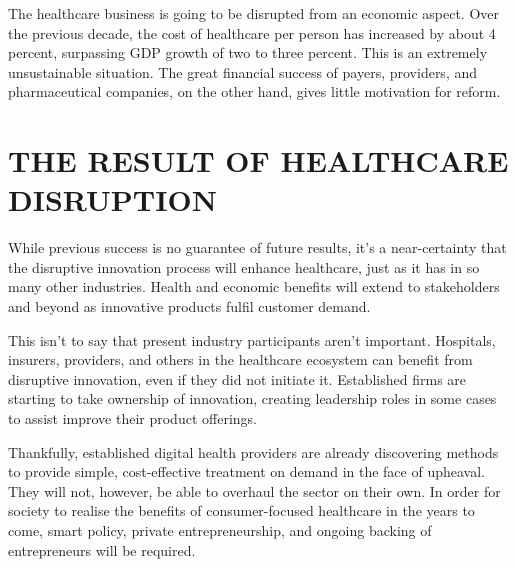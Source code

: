 \documentclass{article}
\begin{document}
The healthcare business is going to be disrupted from an economic aspect.
Over the previous decade, the cost of healthcare per person has increased by about 4 percent, surpassing GDP growth of two to three percent. This is an extremely unsustainable situation. The great financial success of payers, providers, and pharmaceutical companies, on the other hand, gives little motivation for reform.

\section{THE RESULT OF HEALTHCARE DISRUPTION}

While previous success is no guarantee of future results, it's a near-certainty that the disruptive innovation process will enhance healthcare, just as it has in so many other industries. Health and economic benefits will extend to stakeholders and beyond as innovative products fulfil customer demand.


This isn't to say that present industry participants aren't important. Hospitals, insurers, providers, and others in the healthcare ecosystem can benefit from disruptive innovation, even if they did not initiate it. Established firms are starting to take ownership of innovation, creating leadership roles in some cases to assist improve their product offerings.


Thankfully, established digital health providers are already discovering methods to provide simple, cost-effective treatment on demand in the face of upheaval. They will not, however, be able to overhaul the sector on their own. In order for society to realise the benefits of consumer-focused healthcare in the years to come, smart policy, private entrepreneurship, and ongoing backing of entrepreneurs will be required.

%
%
\end{document}
